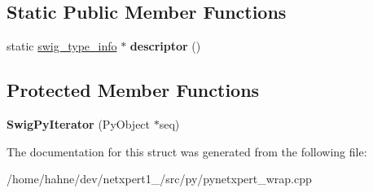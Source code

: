 \subsection*{Static Public Member Functions}
\begin{DoxyCompactItemize}
\item 
static \hyperlink{structswig__type__info}{swig\+\_\+type\+\_\+info} $\ast$ {\bfseries descriptor} ()\hypertarget{structswig_1_1SwigPyIterator_ac77f47f6ed06f7113252940588a3f39e}{}\label{structswig_1_1SwigPyIterator_ac77f47f6ed06f7113252940588a3f39e}

\end{DoxyCompactItemize}
\subsection*{Protected Member Functions}
\begin{DoxyCompactItemize}
\item 
{\bfseries Swig\+Py\+Iterator} (Py\+Object $\ast$seq)\hypertarget{structswig_1_1SwigPyIterator_a88c0a14160ab680c8251f61e01b38d77}{}\label{structswig_1_1SwigPyIterator_a88c0a14160ab680c8251f61e01b38d77}

\end{DoxyCompactItemize}


The documentation for this struct was generated from the following file\+:\begin{DoxyCompactItemize}
\item 
/home/hahne/dev/netxpert1\+\_/src/py/pynetxpert\+\_\+wrap.\+cpp\end{DoxyCompactItemize}

